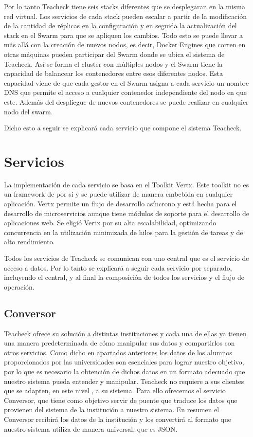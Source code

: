 Por lo tanto Teacheck tiene seis stacks diferentes que se desplegaran
en la misma red virtual. Los servicios de cada stack pueden escalar a
partir de la modificación de la cantidad de réplicas en la
configuración y en seguida la actualización del stack en el Swarm para
que se apliquen los cambios. Todo esto se puede llevar a más allá con
la creación de nuevos nodos, es decir, Docker Engines que corren en
otras máquinas pueden participar del Swarm donde se ubica el sistema
de Teacheck. Así se forma el cluster con múltiples nodos y el Swarm
tiene la capacidad de balancear los contenedores entre esos diferentes
nodos. Esta capacidad viene de que cada gestor en el Swarm asigna a
cada servicio un nombre DNS que permite el acceso a cualquier
contenedor independiente del nodo en que este. Además del despliegue
de nuevos contenedores se puede realizar en cualquier nodo del swarm.

Dicho esto a seguir se explicará cada servicio que compone el sistema
Teacheck.

\section{Servicios}

La implementación de cada servicio se basa en el Toolkit Vertx\cite{vertxDocs}. Este
toolkit no es un framework de por sí y se puede utilizar de manera
embebida en cualquier aplicación. Vertx permite un flujo de desarrollo
asíncrono y está hecha para el desarrollo de microservicios aunque
tiene módulos de soporte para el desarrollo de aplicaciones web. Se
eligió Vertx por su alta escalabilidad, optimizando concurrencia en la
utilización minimizada de hilos para la gestión de tareas y de alto
rendimiento.\cite{reactivex}


Todos los servicios de Teacheck se comunican con uno central que es el
servicio de acceso a datos. Por lo tanto se explicará a seguir cada
servicio por separado, incluyendo el central, y al final la
composición de todos los servicios y el flujo de operación.

\subsection{Conversor}
\label{conversor}

Teacheck ofrece su solución a distintas instituciones y cada una de
ellas ya tienen una manera predeterminada de cómo manipular sus datos
y compartirlos con otros servicios. Como dicho en apartados anteriores
los datos de los alumnos proporcionados por las universidades son
esenciales para lograr nuestro objetivo, por lo que es necesario la
obtención de dichos datos en un formato adecuado que nuestro sistema
pueda entender y manipular. Teacheck no requiere a sus clientes que se
adapten, en este nivel , a su sistema. Para ello ofrecemos el servicio
Conversor, que tiene como objetivo servir de puente que traduce los
datos que provienen del sistema de la institución a nuestro
sistema. En resumen el Conversor recibirá los datos de la institución
y los convertirá al formato que nuestro sistema utiliza de manera
universal, que es JSON.

